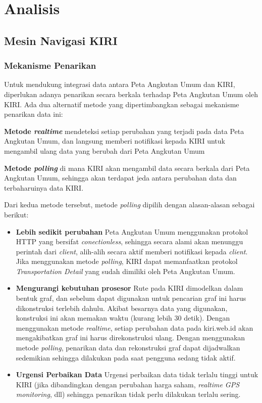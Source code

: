 \chapter{Analisis}

\section{Mesin Navigasi KIRI}

\subsection{Mekanisme Penarikan}

Untuk mendukung integrasi data antara Peta Angkutan Umum dan KIRI, diperlukan adanya penarikan secara berkala terhadap Peta Angkutan Umum oleh KIRI. Ada dua alternatif metode yang dipertimbangkan sebagai mekanisme penarikan data ini:

\begin{description}
	\item \textbf{Metode \textit{realtime}} mendeteksi setiap perubahan yang terjadi pada data Peta Angkutan Umum, dan langsung memberi notifikasi kepada KIRI untuk mengambil ulang data yang berubah dari Peta Angkutan Umum
	\item \textbf{Metode \textit{polling}} di mana KIRI akan mengambil data secara berkala dari Peta Angkutan Umum, sehingga akan terdapat jeda antara perubahan data dan terbaharuinya data KIRI.
\end{description}

Dari kedua metode tersebut, metode \textit{polling} dipilih dengan alasan-alasan sebagai berikut:

\begin{itemize}
	\item \textbf{Lebih sedikit perubahan} Peta Angkutan Umum menggunakan protokol HTTP yang bersifat \textit{conectionless}, sehingga secara alami akan menunggu perintah dari \textit{client}, alih-alih secara aktif memberi notifikasi kepada \textit{client}. Jika menggunakan metode \textit{polling}, KIRI dapat memanfaatkan protokol \textit{Transportation Detail} yang sudah dimiliki oleh Peta Angkutan Umum.
	\item \textbf{Mengurangi kebutuhan prosesor} Rute pada KIRI dimodelkan dalam bentuk graf, dan sebelum dapat digunakan untuk pencarian graf ini harus dikonstruksi terlebih dahulu. Akibat besarnya data yang digunakan, konstruksi ini akan memakan waktu (kurang lebih 30 detik). Dengan menggunakan metode \textit{realtime}, setiap perubahan data pada kiri.web.id akan mengakibatkan graf ini harus direkonstruksi ulang. Dengan menggunakan metode \textit{polling}, penarikan data dan rekonstruksi graf dapat dijadwalkan sedemikian sehingga dilakukan pada saat pengguna sedang tidak aktif.
	\item \textbf{Urgensi Perbaikan Data} Urgensi perbaikan data tidak terlalu tinggi untuk KIRI (jika dibandingkan dengan perubahan harga saham, \textit{realtime GPS monitoring}, dll) sehingga penarikan tidak perlu dilakukan terlalu sering.
\end{itemize}

